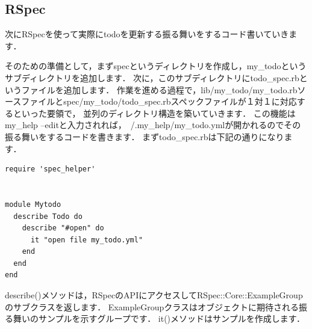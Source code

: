 \subsection{RSpec}
次にRSpecを使って実際にtodoを更新する振る舞いをするコード書いていきます．

そのための準備として，まずspecというディレクトリを作成し，my\_todoというサブディレクトリを追加します．
次に，このサブディレクトリにtodo\_spec.rbというファイルを追加します．
作業を進める過程で，lib/my\_todo/my\_todo.rbソースファイルとspec/my\_todo/todo\_spec.rbスペックファイルが１対１に対応するといった要領で，
並列のディレクトリ構造を築いていきます．
この機能はmy\_help --editと入力されれば，~/.my\_help/my\_todo.ymlが開かれるのでその振る舞いをするコードを書きます．
まずtodo\_spec.rbは下記の通りになります．
\begin{lstlisting}[style=customRuby]
require 'spec_helper'


module Mytodo
  describe Todo do
    describe "#open" do
      it "open file my_todo.yml" 
    end
  end
end

\end{lstlisting}
describe()メソッドは，RSpecのAPIにアクセスしてRSpec::Core::ExampleGroupのサブクラスを返します．
ExampleGroupクラスはオブジェクトに期待される振る舞いのサンプルを示すグループです．
it()メソッドはサンプルを作成します．

